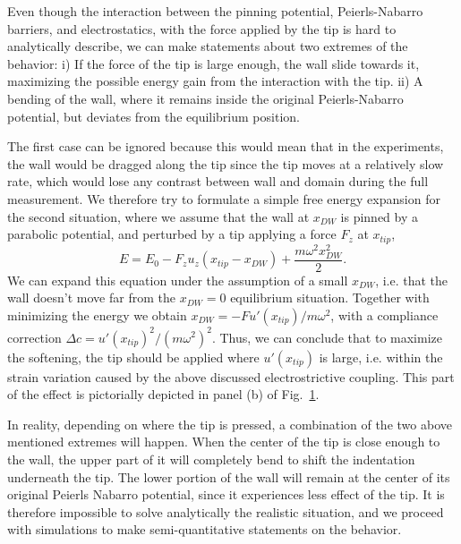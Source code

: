 Even though the interaction between the pinning potential, Peierls-Nabarro barriers, and electrostatics, with the force applied by the tip is hard to analytically describe, we can make statements about two extremes of the behavior: i) If the force of the tip is large enough, the wall slide towards it, maximizing the possible energy gain from the interaction with the tip.
ii) A bending of the wall, where it remains inside the original Peierls-Nabarro potential, but deviates from  the equilibrium position.

The first case can be ignored because this would mean that in the experiments, the wall would be dragged along the tip since the tip moves at a relatively slow rate, which would lose any contrast between wall and domain during the full measurement.
We therefore try to formulate a simple free energy expansion for the second situation, where we assume that the wall at $x_{DW}$ is pinned by a parabolic potential, and perturbed by a tip applying a force $F_z$ at $x_{tip}$,
\begin{equation}
	E = E_0 - F_z u_z (x_{tip} - x_{DW}) + \frac{m\omega^2 x_{DW}^2}{2}.
\end{equation}
We can expand this equation under the assumption of a small $x_{DW}$, i.e. that the wall doesn't move far from the $x_{DW}=0$ equilibrium situation. Together with minimizing the energy we obtain $x_{DW} = -F u'(x_{tip})/m \omega^2$, with a compliance correction $\Delta c = u'(x_{tip})^2/(m\omega^2)^2$. Thus, we can conclude that to maximize the softening, the tip should be applied where $u'(x_{tip})$ is large, i.e. within the strain variation caused by the above discussed electrostrictive coupling. This part of the effect is pictorially depicted in panel (b) of Fig.~\ref{fig:BTO_theory}.

\begin{figure}
	\caption{\label{fig:BTO_theory}}
\end{figure}

In reality, depending on where the tip is pressed, a combination of the two above mentioned extremes will happen.
When the center of the tip is close enough to the wall, the upper part of it will completely bend to shift the indentation underneath the tip.
The lower portion of the wall will remain at the center of its original Peierls Nabarro potential, since it experiences less effect of the tip.
It is therefore impossible to solve analytically the realistic situation, and we proceed with simulations to make semi-quantitative statements on the behavior.

